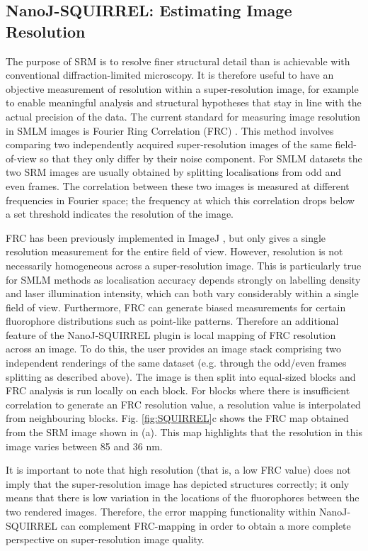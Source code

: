\subsection*{NanoJ-SQUIRREL: Estimating Image Resolution}
The purpose of SRM is to resolve finer structural detail than is achievable with conventional diffraction-limited microscopy. It is therefore useful to have an objective measurement of resolution within a super-resolution image, for example to enable meaningful analysis and structural hypotheses that stay in line with the actual precision of the data. The current standard for measuring image resolution in SMLM images is Fourier Ring Correlation (FRC) \cite{nieuwenhuizen2013measuring}. This method involves comparing two independently acquired super-resolution images of the same field-of-view so that they only differ by their noise component. For SMLM datasets the two SRM images are usually obtained by splitting localisations from odd and even frames. The correlation between these two images is measured at different frequencies in Fourier space; the frequency at which this correlation drops below a set threshold indicates the resolution of the image.

 FRC has been previously implemented in ImageJ \cite{nieuwenhuizen2013measuring}, but only gives a single resolution measurement for the entire field of view. However, resolution is not necessarily homogeneous across a super-resolution image. This is particularly true for SMLM methods as localisation accuracy depends strongly on labelling density and laser illumination intensity, which can both vary considerably within a single field of view. Furthermore, FRC can generate biased measurements for certain fluorophore distributions such as point-like patterns. Therefore an additional feature of the NanoJ-SQUIRREL plugin is local mapping of FRC resolution across an image. To do this, the user provides an image stack comprising two independent renderings of the same dataset (e.g. through the odd/even frames splitting as described above). The image is then split into equal-sized blocks and FRC analysis is run locally on each block. For blocks where there is insufficient correlation to generate an FRC resolution value, a resolution value is interpolated from neighbouring blocks. Fig. \ref{fig:SQUIRREL}c shows the FRC map obtained from the SRM image shown in (a). This map highlights that the resolution in this image varies between 85 and 36 nm.

It is important to note that high resolution (that is, a low FRC value) does not imply that the super-resolution image has depicted structures correctly; it only means that there is low variation in the locations of the fluorophores between the two rendered images. Therefore, the error mapping functionality within NanoJ-SQUIRREL can complement FRC-mapping in order to obtain a more complete perspective on super-resolution image quality.

